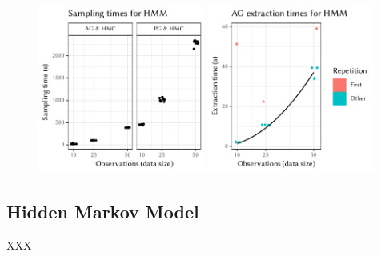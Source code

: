 \cleartoverso
\FloatBlock

\begin{figure}[t!]
  \centering
    \includegraphics[width=0.49\textwidth]{figures/HMM-sampling_times}
  \includegraphics[width=0.49\textwidth]{figures/HMM-compile_times}
  \caption{}
  \label{fig:plots-hmm}
\end{figure}

\subsection*{Hidden Markov Model}

XXX


\cleartorecto
\FloatBlock

